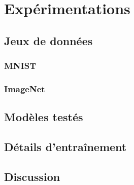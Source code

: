 \chapter{Expérimentations}     %
\label{chap:experiments}                   %

\section{Jeux de données}

\subsection{MNIST}

\subsection{ImageNet}

\section{Modèles testés}

\section{Détails d'entraînement}

\section{Discussion}